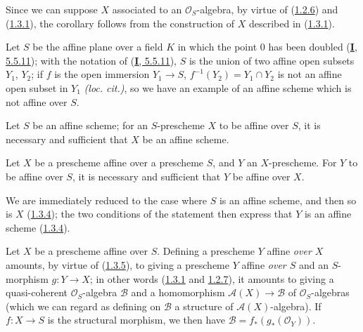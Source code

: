 Since we can suppose $X$ associated to an $\mathcal{O}_S$-algebra, by virtue
of (\hyperref[II.1.2.6]{1.2.6}) and (\hyperref[II.1.3.1]{1.3.1}), the
corollary follows from the construction of $X$ described in
(\hyperref[II.1.3.1]{1.3.1}).

\begin{example}[1.3.3]
\label{II.1.3.3}
Let $S$ be the affine plane over a field $K$ in which the point $0$ has been
doubled (\hyperref[I.5.5.11]{\textbf{I}, 5.5.11}); with the notation of
(\hyperref[I.5.5.11]{\textbf{I}, 5.5.11}), $S$ is the union of two affine open
subsets $Y_1$, $Y_2$; if $f$ is the open immersion $Y_1\to S$,
$f^{-1}(Y_2)=Y_1\cap Y_2$ is not an affine open subset in $Y_1$
\emph{(loc. cit.)}, so we have an example of an affine scheme which is not
affine over $S$.
\end{example}

\begin{corollary}[1.3.4]
\label{II.1.3.4}
Let $S$ be an affine scheme; for an $S$-prescheme $X$ to be affine over
$S$, it is necessary and sufficient that $X$ be an affine scheme.
\end{corollary}

\begin{corollary}[1.3.5]
\label{II.1.3.5}
Let $X$ be a prescheme affine over a prescheme $S$, and $Y$ an
$X$-prescheme. For $Y$ to be affine over $S$, it is necessary and
sufficient that $Y$ be affine over $X$.
\end{corollary}

We are immediately reduced to the case where $S$ is an affine scheme, and
then so is $X$ (\hyperref[II.1.3.4]{1.3.4}); the two conditions of
the statement then express that $Y$ is an affine scheme
(\hyperref[II.1.3.4]{1.3.4}).

\begin{env}[1.3.6]
\label{II.1.3.6}
Let $X$ be a prescheme affine over $S$. Defining a prescheme $Y$
affine \emph{over $X$} amounts, by virtue of
(\hyperref[II.1.3.5]{1.3.5}), to giving a prescheme $Y$ affine
\emph{over $S$} and an $S$-morphism $g:Y\to X$; in other words
(\hyperref[II.1.3.1]{1.3.1} and
\hyperref[II.1.2.7]{1.2.7}), it amounts to giving a quasi-coherent
$\mathcal{O}_S$-algebra $\mathcal{B}$ and a homomorphism
$\mathcal{A}(X)\to\mathcal{B}$ of $\mathcal{O}_S$-algebras (which we can
regard as defining on $\mathcal{B}$ a structure of
$\mathcal{A}(X)$-algebra). If $f:X\to S$ is the structural morphism, we then
have $\mathcal{B}=f_*(g_*(\mathcal{O}_Y))$.
\end{env}

